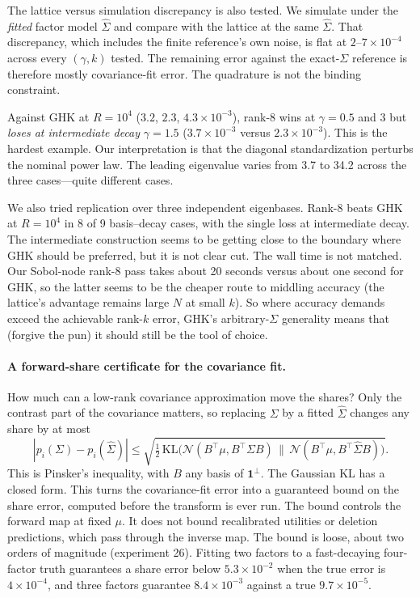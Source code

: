 \documentclass[12pt]{article}
\theoremstyle{remark}
\begin{document}
The lattice versus simulation discrepancy is also tested. We simulate
under the \emph{fitted} factor model $\hat\Sigma$ and compare with the
lattice at the same $\hat\Sigma$. That discrepancy, which includes the
finite reference's own noise, is flat at $2$--$7\times10^{-4}$ across
every $(\gamma, k)$ tested. The remaining error against the
exact-$\Sigma$ reference is therefore mostly covariance-fit error. The
quadrature is not the binding constraint. 

Against GHK at $R = 10^4$
($3.2$, $2.3$, $4.3\times10^{-3}$), rank-8 wins at $\gamma = 0.5$ and $3$
but \emph{loses at intermediate decay} $\gamma = 1.5$
($3.7\times10^{-3}$ versus $2.3\times10^{-3}$). This is the hardest example. 
Our interpretation is that the diagonal standardization 
perturbs the nominal power law. The leading eigenvalue varies from 3.7 to 34.2
across the three cases---quite different cases. 

We also tried replication over three independent eigenbases. Rank-8 beats GHK at $R=10^4$
in 8 of 9 basis--decay cases, with the single loss at intermediate decay.
The intermediate construction seems to be getting close to the boundary where  GHK should be preferred, but 
it is not clear cut. The wall time is not matched. Our Sobol-node
rank-8 pass takes about 20 seconds versus
about one second for GHK, so the latter seems to be the cheaper route to middling accuracy (the lattice's advantage remains large $N$ at small
$k$). So where accuracy demands exceed the achievable rank-$k$
error, GHK's arbitrary-$\Sigma$ generality means that (forgive the pun) it should still be the tool of choice.  

\paragraph{A forward-share certificate for the covariance fit.} How much can a low-rank
covariance approximation move the shares? Only the contrast part of the
covariance matters, so replacing $\Sigma$ by a fitted $\hat\Sigma$
changes any share by at most
\[
|p_i(\Sigma) - p_i(\hat\Sigma)| \le
\sqrt{\tfrac12\,\mathrm{KL}\big(\mathcal{N}(B^\top\mu, B^\top\Sigma B)\,\|\,
\mathcal{N}(B^\top\mu, B^\top\hat\Sigma B)\big)}.
\]
This is Pinsker's inequality, with $B$ any basis of $\mathbf{1}^\perp$.
The Gaussian KL has a closed form. This turns the covariance-fit error into a
guaranteed bound on the share error, computed before the transform is
ever run. The bound controls the forward map at fixed $\mu$. It does
not bound recalibrated utilities or deletion predictions, which pass
through the inverse map. The bound is loose, about two orders of magnitude (experiment 26).
Fitting two factors to a fast-decaying four-factor truth guarantees a
share error below $5.3\times10^{-2}$ when the true error is
$4\times10^{-4}$, and three factors guarantee $8.4\times10^{-3}$
against a true $9.7\times10^{-5}$.
\end{document}
